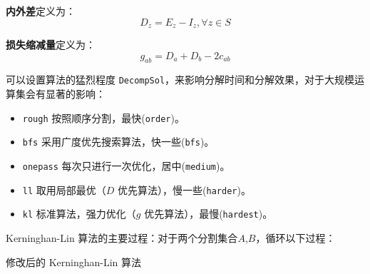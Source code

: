 \documentclass[a4paper,12pt]{article}
\begin{document}
\begin{CJK}{UTF8}{song}
\textbf{内外差}定义为：
\begin{equation}
    D_z = E_z - I_z, \forall z \in S
\end{equation}

\textbf{损失缩减量}定义为：
\begin{equation}
    g_{ab} = D_a + D_b - 2c_{ab}
\end{equation}

可以设置算法的猛烈程度
\texttt{DecompSol}，来影响分解时间和分解效果，对于大规模运算集会有显著的影响：

\begin{itemize}
\item
  \texttt{rough} 按照顺序分割，最快(\texttt{order})。
\item
  \texttt{bfs} 采用广度优先搜索算法，快一些(\texttt{bfs})。
\item
  \texttt{onepass} 每次只进行一次优化，居中(\texttt{medium})。
\item
  \texttt{ll} 取用局部最优（$D$ 优先算法），慢一些(\texttt{harder})。
\item
  \texttt{kl} 标准算法，强力优化（$g$ 优先算法），最慢(\texttt{hardest})。
\end{itemize}

Kerninghan-Lin 算法的主要过程：对于两个分割集合$A$,$B$，循环以下过程：

\begin{algorithm}[H]
    \BlankLine
    \caption{修改后的 Kerninghan-Lin 算法} \label{Alg-KL}
\end{algorithm}


\end{CJK}
\end{document}

